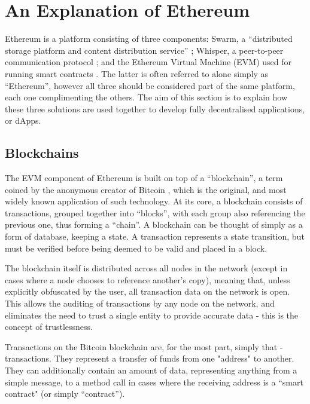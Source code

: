 \section{An Explanation of Ethereum}

Ethereum is a platform consisting of three components: Swarm, a “distributed storage platform and content distribution service” \cite{Swarm}; Whisper, a peer-to-peer communication protocol \cite{Whisper}; and the Ethereum Virtual Machine (EVM) used for running smart contracts \cite{Ethereum}. The latter is often referred to alone simply as “Ethereum”, however all three should be considered part of the same platform, each one complimenting the others. The aim of this section is to explain how these three solutions are used together to develop fully decentralised applications, or dApps.

\subsection{Blockchains}

The EVM component of Ethereum is built on top of a “blockchain”, a term coined by the anonymous creator of Bitcoin \cite{Bitcoin}, which is the original, and most widely known application of such technology. At its core, a blockchain consists of transactions, grouped together into “blocks”, with each group also referencing the previous one, thus forming a “chain”. A blockchain can be thought of simply as a form of database, keeping a state. A transaction represents a state transition, but must be verified before being deemed to be valid and placed in a block.


The blockchain itself is distributed across all nodes in the network (except in cases where a node chooses to reference another’s copy), meaning that, unless explicitly obfuscated by the user, all transaction data on the network is open. This allows the auditing of transactions by any node on the network, and eliminates the need to trust a single entity to provide accurate data - this is the concept of trustlessness.

Transactions on the Bitcoin blockchain are, for the most part, simply that - transactions. They represent a transfer of funds from one "address" to another. They can additionally contain an amount of data, representing anything from a simple message, to a method call in cases where the receiving address is a “smart contract" (or simply “contract”).

